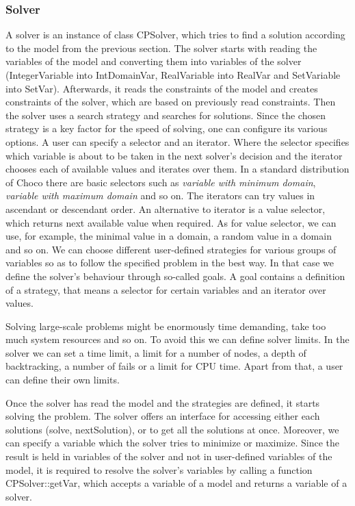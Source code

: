 \subsubsection{Solver}
A solver is an instance of class CPSolver, which tries to find a solution according to the model
from the previous section. The solver starts with reading the variables of the model and 
converting them into variables of the solver (IntegerVariable into IntDomainVar, RealVariable into RealVar and SetVariable into SetVar).
Afterwards, it reads the constraints of the model and creates constraints of the solver, which are based on previously read constraints.
Then the solver uses a search strategy and searches for solutions. Since the chosen strategy
is a key factor for the speed of solving, one can configure its various options.
A user can specify a selector and an iterator. Where the selector specifies which variable
is about to be taken in the next solver's decision and the iterator chooses each of available values
and iterates over them. In a standard distribution of Choco there are basic selectors such as 
{\em variable with minimum domain}, {\em variable with maximum domain} and so on. 
The iterators can try values in ascendant or descendant order. An alternative to iterator
is a value selector, which returns next available value when required. As for value selector,
we can use, for example, the minimal value in a domain, a random value in a domain and so on. We can choose
different user-defined strategies for various groups of variables so as to follow the specified problem
in the best way. In that case we define the solver's behaviour through so-called goals. A goal
contains a definition of a strategy, that means a selector for certain variables and an iterator over values.

Solving large-scale problems might be enormously time demanding, take too much system resources and so on.
To avoid this we can define solver limits. In the solver we can set a time limit, a limit for a number of nodes, 
a depth of backtracking, a number of fails or a limit for CPU time. Apart from that, a user can define their own limits. 

Once the solver has read the model and the strategies are defined, it starts solving the problem.
The solver offers an interface for accessing either each solutions (solve, nextSolution), or to get
all the solutions at once. Moreover, we can specify a variable which the solver tries to minimize or maximize.
Since the result is held in variables of the solver and not in user-defined variables of the model,
it is required to resolve the solver's variables by calling a function CPSolver::getVar, which accepts a variable of a model
and returns a variable of a solver.

